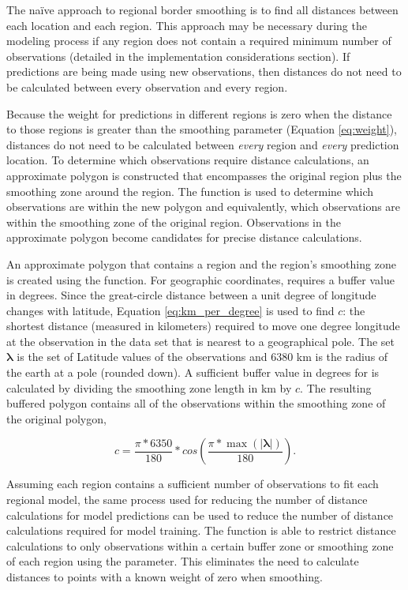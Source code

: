 The na\"ive approach to regional border smoothing is to find all distances between each location and each region. This approach may be necessary during the modeling process if any region does not contain a required minimum number of observations (detailed in the implementation considerations section). If predictions are being made using new observations, then distances do not need to be calculated between every observation and every region.

Because the weight for predictions in different regions is zero when the distance to those regions is greater than the smoothing parameter (Equation \ref{eq:weight}), distances do not need to be calculated between \emph{every} region and \emph{every} prediction location. To determine which observations require distance calculations, an approximate polygon is constructed that encompasses the original region plus the smoothing zone around the region. The function  is used to determine which observations are within the new polygon and equivalently, which observations are within the smoothing zone of the original region. Observations in the approximate polygon become candidates for precise distance calculations. 


An approximate polygon that contains a region and the region's smoothing zone is created using the  function. For geographic coordinates,  requires a buffer value in degrees. Since the great-circle distance between a unit degree of longitude changes with latitude, Equation \ref{eq:km_per_degree} is used to find $c$: the shortest distance (measured in kilometers) required to move one degree longitude at the observation in the data set that is nearest to a geographical pole. The set $\pmb{\lambda}$ is the set of Latitude values of the observations and 6380 km is the radius of the earth at a pole  (rounded down). A sufficient buffer value in degrees for  is calculated by dividing the smoothing zone length in km by $c$. The resulting buffered polygon contains all of the observations within the smoothing zone of the original polygon,

\begin{equation}
    c = \frac{\pi * 6350}{180} * cos\left(\frac{\pi * \max\left(|\pmb{\lambda}|\right)}{180}\right).
    \label{eq:km_per_degree}
\end{equation}

Assuming each region contains a sufficient number of observations to fit each regional model, the same process used for reducing the number of distance calculations for model predictions can be used to reduce the number of distance calculations required for model training. The function  is able to restrict distance calculations to only observations within a certain buffer zone or smoothing zone of each region using the  parameter. This eliminates the need to calculate distances to points with a known weight of zero when smoothing.



